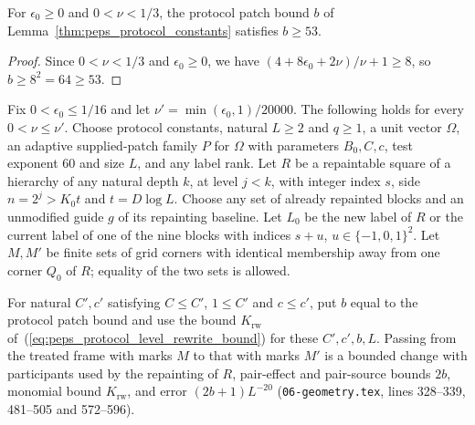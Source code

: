 \begin{lemma}
    \label{thm:peps_protocol_patch_bound_lower}
    \leanok
    For $\epsilon_0\ge0$ and $0<\nu<1/3$, the protocol patch bound $b$ of Lemma~\ref{thm:peps_protocol_constants} satisfies $b\ge53$.
\end{lemma}

\begin{proof}\leanok
    Since $0<\nu<1/3$ and $\epsilon_0\ge0$, we have $(4+8\epsilon_0+2\nu)/\nu+1\ge 8$, so $b\ge 8^2=64\ge 53$.
\end{proof}

\begin{lemma}
    \label{thm:peps_protocol_point_treatment_change}
    \leanok
    Fix $0<\epsilon_0\le1/16$ and let $\nu'=\min(\epsilon_0,1)/20000$. The following holds for
    every $0<\nu\le\nu'$. Choose protocol constants, natural
    $L\ge2$ and $q\ge1$, a unit vector $\Omega$, an adaptive supplied-patch family $P$ for
    $\Omega$ with parameters $B_0,C,c$, test exponent $60$ and size $L$, and any label rank.
    Let $R$ be a repaintable square of a hierarchy of any natural depth $k$, at level $j<k$,
    with integer index $s$, side $n=2^j>K_0t$ and $t=D\log L$. Choose any set of already
    repainted blocks and an unmodified guide $g$ of its repainting baseline. Let $L_0$ be the
    new label of $R$ or the current label of one of the nine blocks with indices $s+u$,
    $u\in\{-1,0,1\}^2$. Let $M,M'$ be finite sets of grid corners with identical membership
    away from one corner $Q_0$ of $R$; equality of the two sets is allowed.

    For natural $C',c'$ satisfying $C\le C'$, $1\le C'$ and $c\le c'$, put $b$ equal to the
    protocol patch bound and use the bound $K_{\mathrm{rw}}$
    of~(\ref{eq:peps_protocol_level_rewrite_bound}) for these $C',c',b,L$. Passing from the
    treated frame with marks $M$ to that with marks $M'$ is a bounded change with participants
    used by the repainting of $R$, pair-effect and pair-source bounds $2b$, monomial bound
    $K_{\mathrm{rw}}$, and error $(2b+1)L^{-20}$ (\texttt{06-geometry.tex}, lines 328--339,
    481--505 and 572--596).
\end{lemma}

